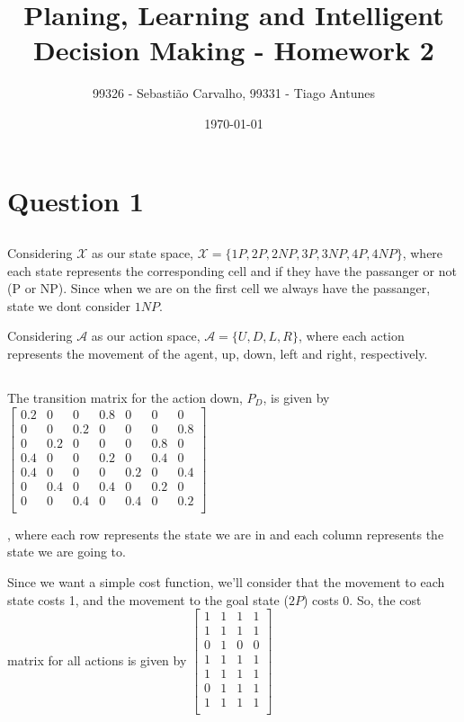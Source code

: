\documentclass{article}
\title{Planing, Learning and Intelligent Decision Making - Homework 2}
\author{99326 - Sebastião Carvalho, 99331 - Tiago Antunes}
\date{\today}
\begin{document}
\maketitle

\tableofcontents

\section{Question 1}

\subsection{}

Considering $\mathcal{X}$ as our state space, $\mathcal{X} = \{1P, 2P, 2NP, 3P, 3NP, 4P, 4NP\}$, 
where each state represents the corresponding cell and if they have the passanger or not (P or NP). 
Since when we are on the first cell we always have the passanger, state we dont consider $1NP$.

Considering $\mathcal{A}$ as our action space, $\mathcal{A} = \{U, D, L, R\}$, 
where each action represents the movement of the agent, up, down, left and right, respectively.

\subsection{}

The transition matrix for the action down, $P_D$, is given by
$\begin{bmatrix}
    0.2 & 0 & 0 & 0.8 & 0 & 0 & 0 \\
    0 & 0 & 0.2 & 0 & 0 & 0 & 0.8 \\
    0 & 0.2 & 0 & 0 & 0 & 0.8 & 0 \\
    0.4 & 0 & 0 & 0.2 & 0 & 0.4 & 0 \\
    0.4 & 0 & 0 & 0 & 0.2 & 0 & 0.4 \\
    0 & 0.4 & 0 & 0.4 & 0 & 0.2 & 0 \\
    0 & 0 & 0.4 & 0 & 0.4 & 0 & 0.2 \\
\end{bmatrix}$

\medskip

, where each row represents the state we are in and each column represents the state we are going to.

\bigskip

Since we want a simple cost function, we'll consider that the movement to each state costs 1,
and the movement to the goal state ($2P$) costs 0. So, the cost matrix for all actions is given by
$\begin{bmatrix}
    1 & 1 & 1 & 1 \\
    1 & 1 & 1 & 1 \\
    0 & 1 & 0 & 0 \\
    1 & 1 & 1 & 1 \\
    1 & 1 & 1 & 1 \\
    0 & 1 & 1 & 1 \\
    1 & 1 & 1 & 1 \\
\end{bmatrix}$
\end{document}
